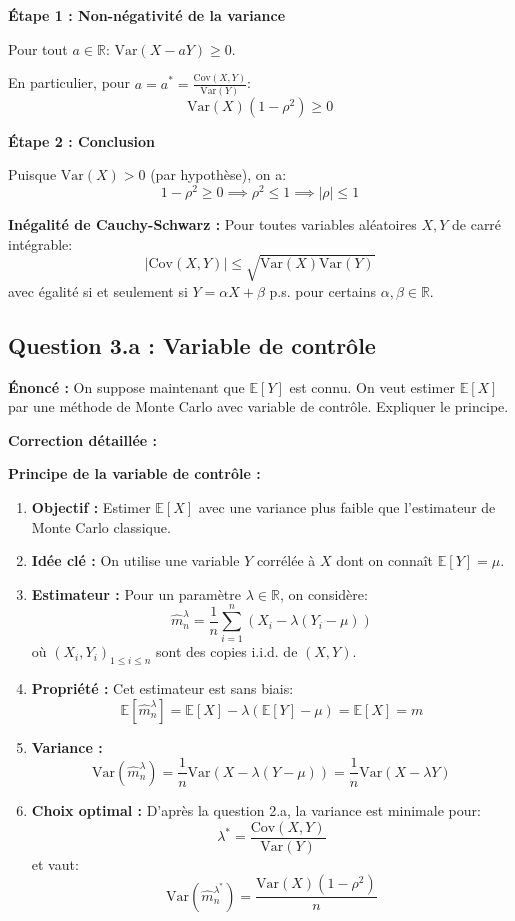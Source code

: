 \documentclass[12pt,a4paper]{article}
\theoremstyle{definition}
\newcommand{\E}{\mathbb{E}}
\newcommand{\Var}{\mathrm{Var}}
\newcommand{\Cov}{\mathrm{Cov}}
\newcommand{\R}{\mathbb{R}}
\begin{document}
\textbf{Étape 1 : Non-négativité de la variance}

Pour tout $a \in \R$: $\Var(X - aY) \geq 0$.

En particulier, pour $a = a^* = \frac{\Cov(X,Y)}{\Var(Y)}$:
\[
\Var(X)(1 - \rho^2) \geq 0
\]

\textbf{Étape 2 : Conclusion}

Puisque $\Var(X) > 0$ (par hypothèse), on a:
\[
1 - \rho^2 \geq 0 \implies \rho^2 \leq 1 \implies |\rho| \leq 1
\]

\begin{rappel}
\textbf{Inégalité de Cauchy-Schwarz :} Pour toutes variables aléatoires $X, Y$ de carré intégrable:
\[
|\Cov(X,Y)| \leq \sqrt{\Var(X)\Var(Y)}
\]
avec égalité si et seulement si $Y = \alpha X + \beta$ p.s. pour certains $\alpha, \beta \in \R$.
\end{rappel}

\subsection{Question 3.a : Variable de contrôle}

\textbf{Énoncé :} On suppose maintenant que $\E[Y]$ est connu. On veut estimer $\E[X]$ par une méthode de Monte Carlo avec variable de contrôle. Expliquer le principe.

\textbf{Correction détaillée :}

\textbf{Principe de la variable de contrôle :}

\begin{enumerate}
    \item \textbf{Objectif :} Estimer $\E[X]$ avec une variance plus faible que l'estimateur de Monte Carlo classique.
    
    \item \textbf{Idée clé :} On utilise une variable $Y$ corrélée à $X$ dont on connaît $\E[Y] = \mu$.
    
    \item \textbf{Estimateur :} Pour un paramètre $\lambda \in \R$, on considère:
    \[
    \hat{m}_n^{\lambda} = \frac{1}{n}\sum_{i=1}^{n} (X_i - \lambda(Y_i - \mu))
    \]
    où $(X_i, Y_i)_{1 \leq i \leq n}$ sont des copies i.i.d. de $(X, Y)$.
    
    \item \textbf{Propriété :} Cet estimateur est sans biais:
    \[
    \E[\hat{m}_n^{\lambda}] = \E[X] - \lambda(\E[Y] - \mu) = \E[X] = m
    \]
    
    \item \textbf{Variance :}
    \[
    \Var(\hat{m}_n^{\lambda}) = \frac{1}{n}\Var(X - \lambda(Y - \mu)) = \frac{1}{n}\Var(X - \lambda Y)
    \]
    
    \item \textbf{Choix optimal :} D'après la question 2.a, la variance est minimale pour:
    \[
    \lambda^* = \frac{\Cov(X,Y)}{\Var(Y)}
    \]
    et vaut:
    \[
    \Var(\hat{m}_n^{\lambda^*}) = \frac{\Var(X)(1-\rho^2)}{n}
    \]
\end{enumerate}
\end{document}
